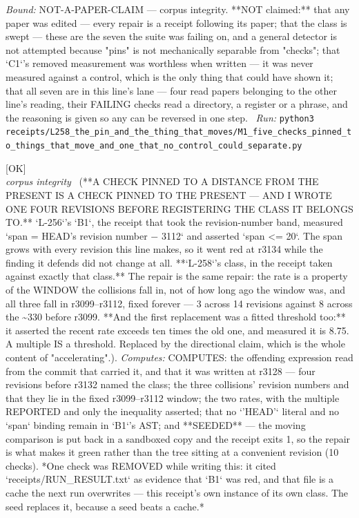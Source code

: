 \begin{description}
 \emph{Bound:} NOT-A-PAPER-CLAIM --- corpus integrity. **NOT claimed:** that any paper was edited --- every repair is a receipt following its paper; that the class is swept --- these are the seven the suite was failing on, and a general detector is not attempted because "pins" is not mechanically separable from "checks"; that `C1`'s removed measurement was worthless when written --- it was never measured against a control, which is the only thing that could have shown it; that all seven are in this line's lane --- four read papers belonging to the other line's reading, their FAILING checks read a directory, a register or a phrase, and the reasoning is given so any can be reversed in one step.
\ \emph{Run:} \texttt{python3 receipts/L258\_the\_pin\_and\_the\_thing\_that\_moves/M1\_five\_checks\_pinned\_to\_things\_that\_move\_and\_one\_that\_no\_control\_could\_separate.py}
\item[\label{rcpt:D1_a_check_pinned_to_a_distance_from_the_present_is_pinned_to_the_present}\texttt{D1\_a\_check\_pinned\_to\_a\_distance\_from\_the\_present\_is\_pinned\_to\_the\_present}]\hfill\textsf{[OK]}\\
\textit{corpus integrity} \ (**A CHECK PINNED TO A DISTANCE FROM THE PRESENT IS A CHECK PINNED TO THE PRESENT --- AND I WROTE ONE FOUR REVISIONS BEFORE REGISTERING THE CLASS IT BELONGS TO.** `L-256`'s `B1`, the receipt that took the revision-number band, measured `span = HEAD's revision number \ensuremath{-} 3112` and asserted `span <= 20`. The span grows with every revision this line makes, so it went red at r3134 while the finding it defends did not change at all. **`L-258`'s class, in the receipt taken against exactly that class.** The repair is the same repair: the rate is a property of the WINDOW the collisions fall in, not of how long ago the window was, and all three fall in r3099--r3112, fixed forever --- 3 across 14 revisions against 8 across the \textasciitilde{}330 before r3099. **And the first replacement was a fitted threshold too:** it asserted the recent rate exceeds ten times the old one, and measured it is 8.75. A multiple IS a threshold. Replaced by the directional claim, which is the whole content of "accelerating".). 
\emph{Computes:} COMPUTES: the offending expression read from the commit that carried it, and that it was written at r3128 --- four revisions before r3132 named the class; the three collisions' revision numbers and that they lie in the fixed r3099--r3112 window; the two rates, with the multiple REPORTED and only the inequality asserted; that no `'HEAD'` literal and no `span` binding remain in `B1`'s AST; and **SEEDED** --- the moving comparison is put back in a sandboxed copy and the receipt exits 1, so the repair is what makes it green rather than the tree sitting at a convenient revision (10 checks).  *One check was REMOVED while writing this: it cited `receipts/RUN\_RESULT.txt` as evidence that `B1` was red, and that file is a cache the next run overwrites --- this receipt's own instance of its own class. The seed replaces it, because a seed beats a cache.*

\end{description}
